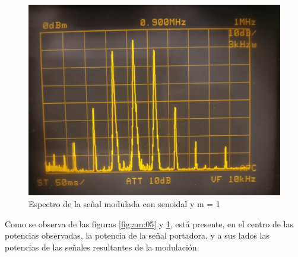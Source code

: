 \begin{figure}[ht]
    \begin{center}
        \includegraphics[width=0.6\linewidth]{contenido/img/espectro_am1.jpg}
        \caption{Espectro de la señal modulada con senoidal y m = 1}
        \label{fig:am:1}
    \end{center}
\end{figure}

Como se observa de las figuras \ref{fig:am:05} y \ref{fig:am:1}, está presente,
en el centro de las potencias observadas, la potencia de la señal portadora, y a
sus lados las potencias de las señales resultantes de la modulación.